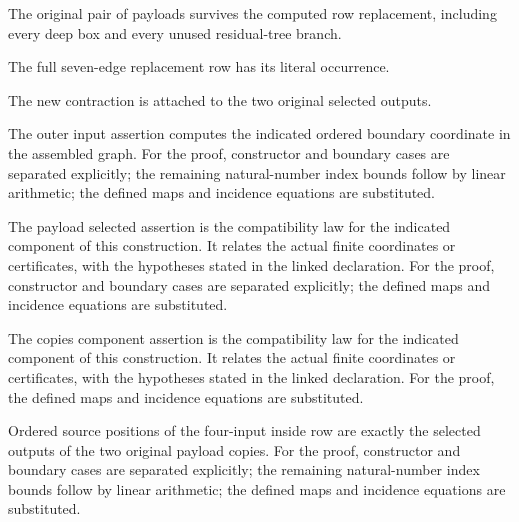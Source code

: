 The original pair of payloads survives the computed row replacement, including every deep box and every unused residual-tree branch.
\par{}

The full seven-edge replacement row has its literal occurrence.
\par{}

The new contraction is attached to the two original selected outputs.
\par{}

The outer input assertion computes the indicated ordered boundary coordinate in the assembled graph.
For the proof, constructor and boundary cases are separated explicitly; the remaining natural-number index bounds follow by linear arithmetic; the defined maps and incidence equations are substituted.
\par{}

The payload selected assertion is the compatibility law for the indicated component of this construction. It relates the actual finite coordinates or certificates, with the hypotheses stated in the linked declaration.
For the proof, constructor and boundary cases are separated explicitly; the defined maps and incidence equations are substituted.
\par{}

The copies component assertion is the compatibility law for the indicated component of this construction. It relates the actual finite coordinates or certificates, with the hypotheses stated in the linked declaration.
For the proof, the defined maps and incidence equations are substituted.
\par{}

Ordered source positions of the four-input inside row are exactly the selected outputs of the two original payload copies.
For the proof, constructor and boundary cases are separated explicitly; the remaining natural-number index bounds follow by linear arithmetic; the defined maps and incidence equations are substituted.
\par{}

